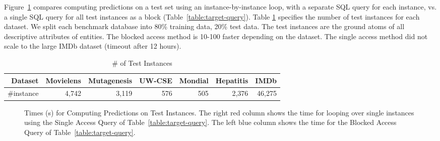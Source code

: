 \documentclass{IEEEtran}
\begin{document}
Figure~\ref{fig:test-timing} compares computing predictions on a test set using an instance-by-instance loop, with a separate SQL query for each instance, vs. a single SQL query for all test instances as a block (Table~\ref{table:target-query}). Table \ref{tab:test-instance} specifies the number of  test instances for each dataset. We split each benchmark database into  80\% training data, 20\% test data. The test instances are the ground atoms of all descriptive attributes of entities.  The blocked access method is 10-100 faster depending on the dataset. The single access method did not scale to the large IMDb dataset (timeout after 12 hours).

\begin{table}[htbp]
\caption{\# of Test Instances }
  \centering
  \begin{tabular}{|r|r|r|r|r|r|r|} \hline
\textbf{Dataset}&Movielens&	Mutagenesis	& 	UW-CSE	&	Mondial&	Hepatitis&	 	IMDb \\ \hline
{\#instance}	&4,742	 	&	3,119		&576	&		505&2,376	 	&46,275 \\ \hline
    
\end{tabular}%
  \label{tab:test-instance}%
\end{table}%

\begin{figure}[htbp] %
 \centering
{} 
\caption{Times (s) for Computing Predictions on Test Instances. The right red column shows the time for looping over single instances using the Single Access Query of Table~\ref{table:target-query}. The left blue column shows the time for the Blocked Access Query of Table~\ref{table:target-query}.
}
 \label{fig:test-timing}
\end{figure}
\end{document}
